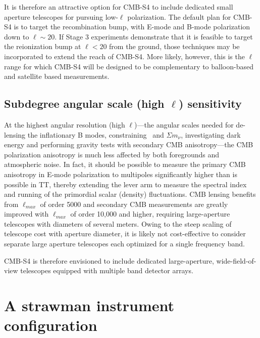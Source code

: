 It is therefore an attractive option for CMB-S4 to include dedicated small aperture telescopes for pursuing low-$\ell$ polarization. The default plan for CMB-S4 is to target the recombination bump, with E-mode and B-mode polarization down to $\ell \sim 20$. If Stage 3 experiments demonstrate that it is feasible to target the reionization bump at $\ell < 20$ from the ground, those techniques may be incorporated to extend the reach of CMB-S4. More likely, however, this is the $\ell$ range for which CMB-S4 will be designed to be complementary to balloon-based and satellite based measurements. 

\subsection{Subdegree angular scale (high $\ell$) sensitivity}

At the highest angular resolution (high $\ell$)---the angular scales needed for de-lensing the inflationary B modes, constraining \neff\ and $\Sigma m_\nu$,  investigating dark energy and performing gravity tests with secondary CMB  anisotropy---the CMB polarization anisotropy is much less affected by both foregrounds and atmospheric noise. In fact, it should be possible to measure the primary CMB anisotropy in E-mode polarization to multipoles significantly higher than is possible in TT, thereby extending the lever arm to measure the spectral index and running of the primordial scalar (density) fluctuations. CMB lensing benefits from $\ell_{max}$ of order 5000 and secondary CMB measurements are greatly improved with $\ell_{max}$ of order 10,000 and higher, requiring large-aperture telescopes with diameters of several meters. Owing to the steep scaling of telescope cost with aperture diameter, it is likely not cost-effective to consider separate large aperture telescopes each optimized for a single frequency band. 

CMB-S4 is therefore envisioned to include dedicated large-aperture, wide-field-of-view telescopes equipped with multiple band detector arrays.

\section{A strawman instrument configuration}
\label{sec:strawman}

